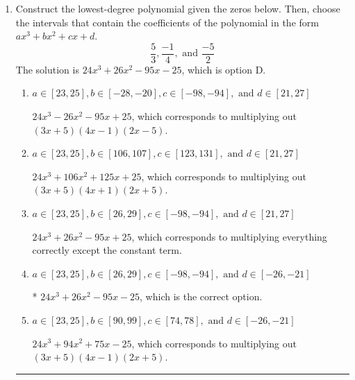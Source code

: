 \documentclass{extbook}[14pt]
\newcommand{\litem}[1]{\item #1

\rule{\textwidth}{0.4pt}}
\begin{document}
\begin{enumerate}\litem{
Construct the lowest-degree polynomial given the zeros below. Then, choose the intervals that contain the coefficients of the polynomial in the form $ax^3+bx^2+cx+d$.
\[ \frac{5}{3}, \frac{-1}{4}, \text{ and } \frac{-5}{2} \]The solution is \( 24x^{3} +26 x^{2} -95 x -25 \), which is option D.\begin{enumerate}[label=\Alph*.]
\item \( a \in [23, 25], b \in [-28, -20], c \in [-98, -94], \text{ and } d \in [21, 27] \)

$24x^{3} -26 x^{2} -95 x + 25$, which corresponds to multiplying out $(3x + 5)(4x -1)(2x -5)$.
\item \( a \in [23, 25], b \in [106, 107], c \in [123, 131], \text{ and } d \in [21, 27] \)

$24x^{3} +106 x^{2} +125 x + 25$, which corresponds to multiplying out $(3x + 5)(4x + 1)(2x + 5)$.
\item \( a \in [23, 25], b \in [26, 29], c \in [-98, -94], \text{ and } d \in [21, 27] \)

$24x^{3} +26 x^{2} -95 x + 25$, which corresponds to multiplying everything correctly except the constant term.
\item \( a \in [23, 25], b \in [26, 29], c \in [-98, -94], \text{ and } d \in [-26, -21] \)

* $24x^{3} +26 x^{2} -95 x -25$, which is the correct option.
\item \( a \in [23, 25], b \in [90, 99], c \in [74, 78], \text{ and } d \in [-26, -21] \)

$24x^{3} +94 x^{2} +75 x -25$, which corresponds to multiplying out $(3x + 5)(4x -1)(2x + 5)$.
\end{enumerate}

}
\end{enumerate}
\end{document}
